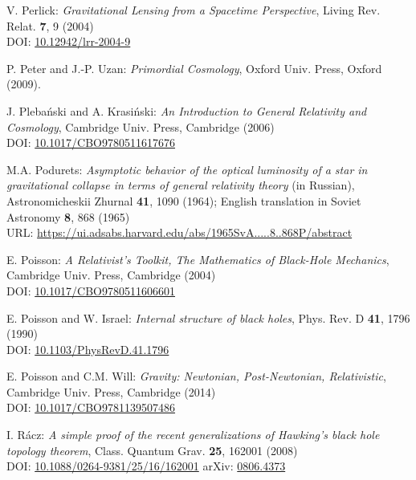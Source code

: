 \begin{thebibliography}{123}
V. Perlick:
{\em Gravitational Lensing from a Spacetime Perspective},
Living Rev. Relat. {\bf 7}, 9 (2004)\\
DOI: \href{https://doi.org/10.12942/lrr-2004-9}{10.12942/lrr-2004-9}

P. Peter and J.-P. Uzan: {\em Primordial Cosmology},
Oxford Univ. Press, Oxford (2009).

J. Pleba\'nski and A. Krasi\'nski:
{\em An Introduction to General Relativity and Cosmology},
Cambridge Univ. Press, Cambridge (2006)\\
DOI: \href{https://doi.org/10.1017/CBO9780511617676}{10.1017/CBO9780511617676}

M.A. Podurets:
{\em Asymptotic behavior of the optical luminosity of a star in gravitational collapse
in terms of general relativity theory}
(in Russian),
Astronomicheskii Zhurnal {\bf 41}, 1090 (1964);
English translation in Soviet Astronomy {\bf 8}, 868 (1965)\\
URL: \url{https://ui.adsabs.harvard.edu/abs/1965SvA.....8..868P/abstract}

E. Poisson: \emph{A Relativist's Toolkit,
The Mathematics of Black-Hole Mechanics},
Cambridge Univ. Press, Cambridge (2004) \\
DOI: \href{https://doi.org/10.1017/CBO9780511606601}{10.1017/CBO9780511606601}

E. Poisson and W. Israel: {\em Internal structure of black holes},
Phys. Rev. D {\bf 41}, 1796 (1990) \\
DOI: \href{https://doi.org/10.1103/PhysRevD.41.1796}{10.1103/PhysRevD.41.1796}

E. Poisson and C.M. Will: {\em Gravity: Newtonian, Post-Newtonian, Relativistic},
Cambridge Univ. Press, Cambridge (2014) \\
DOI: \href{https://doi.org/10.1017/CBO9781139507486}{10.1017/CBO9781139507486}

I. R\'acz:
{\em A simple proof of the recent generalizations of Hawking's black hole topology theorem},
Class. Quantum Grav. {\bf 25}, 162001 (2008)\\
DOI: \href{https://doi.org/10.1088/0264-9381/25/16/162001}{10.1088/0264-9381/25/16/162001}\hfill
arXiv: \href{https://arxiv.org/abs/0806.4373}{0806.4373}


\end{thebibliography}
